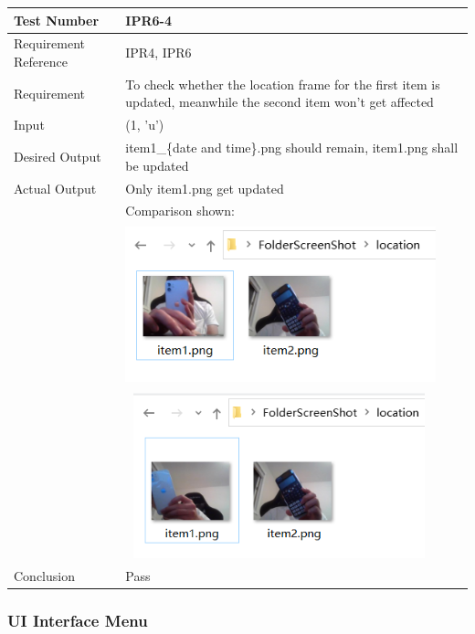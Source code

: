 \documentclass[12pt, titlepage]{article}
\begin{document}
\begin{table}[H]
\begin{center}
\begin{tabular}{|l | m{9cm}|}
\hline
  Test Number & IPR6-4\\
  \hline
  Requirement Reference & IPR4, IPR6\\
  \hline
  Requirement &  To check whether the location frame for the first item is updated, meanwhile the second item won't get affected\\
  \hline
  Input & (1, 'u')\\
  \hline
  Desired Output & item1\_\{date and time\}.png should remain, item1.png shall be updated\\
  \hline
  Actual Output & Only item1.png get updated\\&Comparison shown:\\&\includegraphics[width=90mm, height=46mm]{UT41.png}\\&\includegraphics[width=89mm, height=48mm]{UT42.png}\\
  \hline
  Conclusion & Pass\\
  \hline
\end{tabular}
\end{center}           
\end{table}
\subsubsection{UI Interface Menu}
\end{document}
